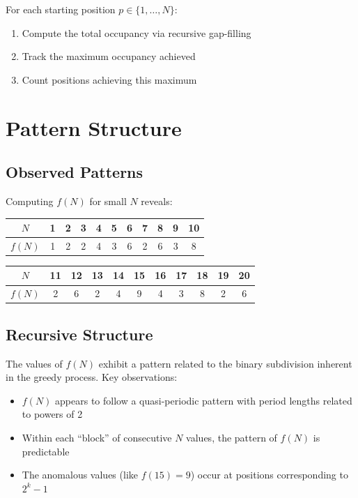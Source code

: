 \documentclass[11pt]{article}
\begin{document}
For each starting position $p \in \{1, \ldots, N\}$:
\begin{enumerate}
\item Compute the total occupancy via recursive gap-filling
\item Track the maximum occupancy achieved
\item Count positions achieving this maximum
\end{enumerate}

\section{Pattern Structure}

\subsection{Observed Patterns}

Computing $f(N)$ for small $N$ reveals:

\begin{center}
\begin{tabular}{c|cccccccccc}
$N$ & 1 & 2 & 3 & 4 & 5 & 6 & 7 & 8 & 9 & 10 \\
\hline
$f(N)$ & 1 & 2 & 2 & 4 & 3 & 6 & 2 & 6 & 3 & 8
\end{tabular}
\end{center}

\begin{center}
\begin{tabular}{c|cccccccccc}
$N$ & 11 & 12 & 13 & 14 & 15 & 16 & 17 & 18 & 19 & 20 \\
\hline
$f(N)$ & 2 & 6 & 2 & 4 & 9 & 4 & 3 & 8 & 2 & 6
\end{tabular}
\end{center}

\subsection{Recursive Structure}

The values of $f(N)$ exhibit a pattern related to the binary subdivision inherent in the greedy process. Key observations:

\begin{itemize}
\item $f(N)$ appears to follow a quasi-periodic pattern with period lengths related to powers of 2
\item Within each ``block'' of consecutive $N$ values, the pattern of $f(N)$ is predictable
\item The anomalous values (like $f(15) = 9$) occur at positions corresponding to $2^k - 1$
\end{itemize}
\end{document}
